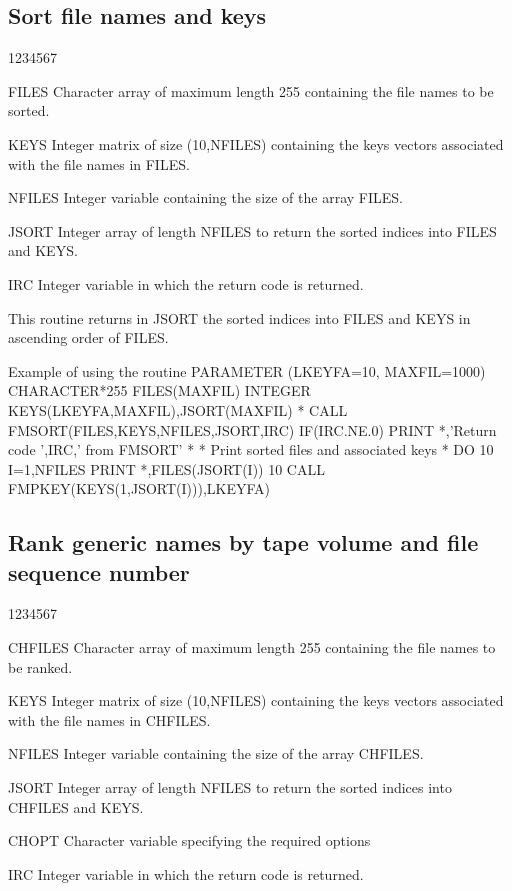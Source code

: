 \subsection{Sort file names and keys}
\begin{DLtt}{1234567}
\item[FILES]
Character array of maximum length 255 containing the file names
to be sorted.
\item[KEYS]
Integer matrix of size (10,NFILES) containing the keys
vectors associated with the file names in FILES.
\item[NFILES]
Integer variable containing the size of the array FILES.
\item[JSORT]
Integer array of length NFILES to return the sorted indices
into FILES and KEYS.
\item[IRC]
Integer variable in which the return code is returned.
\end{DLtt}
\par
This routine returns in JSORT the sorted indices into FILES
and KEYS in ascending order of FILES.
\begin{XMPt}{Example of using the \protect{} routine}
      PARAMETER     (LKEYFA=10, MAXFIL=1000)
      CHARACTER*255 FILES(MAXFIL)
      INTEGER       KEYS(LKEYFA,MAXFIL),JSORT(MAXFIL)
*
      CALL FMSORT(FILES,KEYS,NFILES,JSORT,IRC)
      IF(IRC.NE.0) PRINT *,'Return code ',IRC,' from FMSORT'
*
*     Print sorted files and associated keys
*
      DO 10 I=1,NFILES
      PRINT *,FILES(JSORT(I))
10    CALL FMPKEY(KEYS(1,JSORT(I))),LKEYFA)
\end{XMPt}

\subsection{Rank generic names by tape volume and file sequence number}
\begin{DLtt}{1234567}
\item[CHFILES]
Character array of maximum length 255 containing the file names
to be ranked.
\item[KEYS]
Integer matrix of size (10,NFILES) containing the keys
vectors associated with the file names in CHFILES.
\item[NFILES]
Integer variable containing the size of the array CHFILES.
\item[JSORT]
Integer array of length NFILES to return the sorted indices
into CHFILES and KEYS.
\item[CHOPT]
Character variable specifying the required options
\item[IRC]
Integer variable in which the return code is returned.
\end{DLtt}

